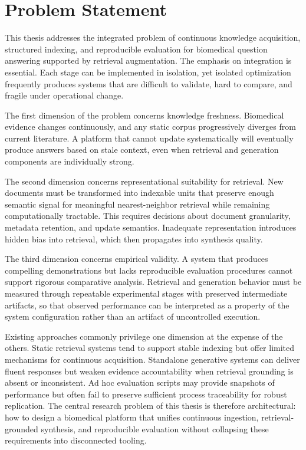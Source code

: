 \section{Problem Statement}

This thesis addresses the integrated problem of continuous knowledge acquisition, structured indexing, and reproducible evaluation for biomedical question answering supported by retrieval augmentation. The emphasis on integration is essential. Each stage can be implemented in isolation, yet isolated optimization frequently produces systems that are difficult to validate, hard to compare, and fragile under operational change.

The first dimension of the problem concerns knowledge freshness. Biomedical evidence changes continuously, and any static corpus progressively diverges from current literature. A platform that cannot update systematically will eventually produce answers based on stale context, even when retrieval and generation components are individually strong.

The second dimension concerns representational suitability for retrieval. New documents must be transformed into indexable units that preserve enough semantic signal for meaningful nearest-neighbor retrieval while remaining computationally tractable. This requires decisions about document granularity, metadata retention, and update semantics. Inadequate representation introduces hidden bias into retrieval, which then propagates into synthesis quality.

The third dimension concerns empirical validity. A system that produces compelling demonstrations but lacks reproducible evaluation procedures cannot support rigorous comparative analysis. Retrieval and generation behavior must be measured through repeatable experimental stages with preserved intermediate artifacts, so that observed performance can be interpreted as a property of the system configuration rather than an artifact of uncontrolled execution.

Existing approaches commonly privilege one dimension at the expense of the others. Static retrieval systems tend to support stable indexing but offer limited mechanisms for continuous acquisition. Standalone generative systems can deliver fluent responses but weaken evidence accountability when retrieval grounding is absent or inconsistent. Ad hoc evaluation scripts may provide snapshots of performance but often fail to preserve sufficient process traceability for robust replication. The central research problem of this thesis is therefore architectural: how to design a biomedical platform that unifies continuous ingestion, retrieval-grounded synthesis, and reproducible evaluation without collapsing these requirements into disconnected tooling.

